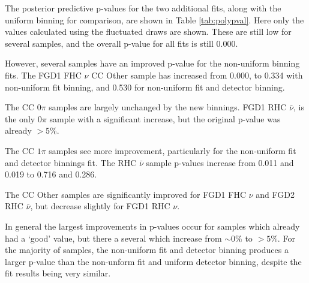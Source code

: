 The posterior predictive p-values for the two additional fits, along with the uniform binning for comparison, are shown in Table \ref{tab:polypval}. Here only the values calculated using the fluctuated draws are shown. These are still low for several samples, and the overall p-value for all fits is still 0.000. 

However, several samples have an improved p-value for the non-uniform binning fits. The FGD1 FHC $\nu$ CC Other sample has increased from 0.000, to 0.334 with non-uniform fit binning, and 0.530 for non-uniform fit and detector binning. 

The CC $0\pi$ samples are largely unchanged by the new binnings. FGD1 RHC $\bar{\nu}$, is the only 0$\pi$ sample with a significant increase, but the original p-value was already $>5\%$.

The CC $1\pi$ samples see more improvement, particularly for the non-uniform fit and detector binnings fit. The RHC $\bar{\nu}$ sample p-values increase from 0.011 and 0.019 to 0.716 and 0.286. 

The CC Other samples are significantly improved for FGD1 FHC $\nu$ and FGD2 RHC $\bar{\nu}$, but decrease slightly for FGD1 RHC $\nu$. 

In general the largest improvements in p-values occur for samples which already had a `good' value, but there a several which increase from $\sim0\%$ to $>5\%$. For the majority of samples, the non-uniform fit and detector binning produces a larger p-value than the non-unform fit and uniform detector binning, despite the fit results being very similar. 

